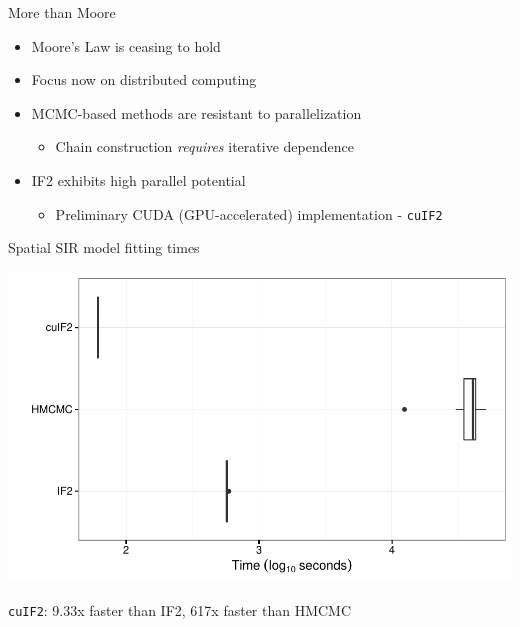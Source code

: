 \documentclass[12pt]{beamer}
\begin{document}
\begin{frame}

	More than Moore
	\vspace{\baselineskip}

	\begin{itemize}
		\item Moore's Law is ceasing to hold
		\item Focus now on distributed computing
		\item MCMC-based methods are resistant to parallelization
		\begin{itemize}
		 	\item Chain construction \textit{requires} iterative dependence
		\end{itemize} 
		\item IF2 exhibits high parallel potential
		\begin{itemize}
			\item Preliminary CUDA (GPU-accelerated) implementation - \texttt{cuIF2}
		\end{itemize}
	\end{itemize}

\end{frame}

\begin{frame}

	\null
	Spatial SIR model fitting times

	\vfill
	\includegraphics[width=\textwidth,height=\textheight,keepaspectratio=true]{../../writing/SPATIAL/images/timeplot2}
	\vfill

	\centering
	\footnotesize
	\texttt{cuIF2}: 9.33x faster than IF2, 617x faster than HMCMC

\end{frame}
\end{document}
